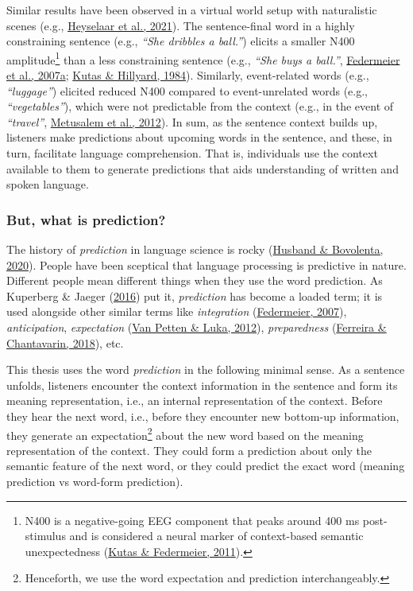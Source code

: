 \documentclass[a4paper, nobind]{templates/ociamthesis}
\begin{document}
Similar results have been observed in a virtual world setup with naturalistic scenes (e.g., \protect\hyperlink{ref-Heyselaar2021}{Heyselaar et al., 2021}).
The sentence-final word in a highly constraining sentence (e.g., \emph{``She dribbles a ball.''}) elicits a smaller N400 amplitude\footnote{N400 is a negative-going EEG component that peaks around 400 ms post-stimulus and is considered a neural marker of context-based semantic unexpectedness (\protect\hyperlink{ref-Kutas2011}{Kutas \& Federmeier, 2011}).} than a less constraining sentence (e.g., \emph{``She buys a ball.''}, \protect\hyperlink{ref-Federmeier2007}{Federmeier et al., 2007a}; \protect\hyperlink{ref-Kutas1984}{Kutas \& Hillyard, 1984}).
Similarly, event-related words (e.g., \emph{``luggage''}) elicited reduced N400 compared to event-unrelated words (e.g., \emph{``vegetables''}), which were not predictable from the context (e.g., in the event of \emph{``travel''}, \protect\hyperlink{ref-Metusalem2012}{Metusalem et al., 2012}).
In sum, as the sentence context builds up, listeners make predictions about upcoming words in the sentence, and these, in turn, facilitate language comprehension.
That is, individuals use the context available to them to generate predictions that aids understanding of written and spoken language.

\hypertarget{but-what-is-prediction}{%
\subsubsection{But, what is prediction?}\label{but-what-is-prediction}}

\noindent
The history of \emph{prediction} in language science is rocky (\protect\hyperlink{ref-Husband2020}{Husband \& Bovolenta, 2020}).
People have been sceptical that language processing is predictive in nature.
Different people mean different things when they use the word prediction.
As Kuperberg \& Jaeger (\protect\hyperlink{ref-Kuperberg2016}{2016}) put it, \emph{prediction} has become a loaded term;
it is used alongside other similar terms like \emph{integration} (\protect\hyperlink{ref-Federmeier2007a}{Federmeier, 2007}), \emph{anticipation}, \emph{expectation} (\protect\hyperlink{ref-VanPetten2012}{Van Petten \& Luka, 2012}), \emph{preparedness} (\protect\hyperlink{ref-Ferreira2018}{Ferreira \& Chantavarin, 2018}), etc.

This thesis uses the word \emph{prediction} in the following minimal sense.
As a sentence unfolds, listeners encounter the context information in the sentence and form its meaning representation, i.e.,
an internal representation of the context.
Before they hear the next word, i.e., before they encounter new bottom-up information,
they generate an expectation\footnote{Henceforth, we use the word expectation and prediction interchangeably.
} about the new word based on the meaning representation of the context.
They could form a prediction about only the semantic feature of the next word,
or they could predict the exact word (meaning prediction vs word-form prediction).
\end{document}
